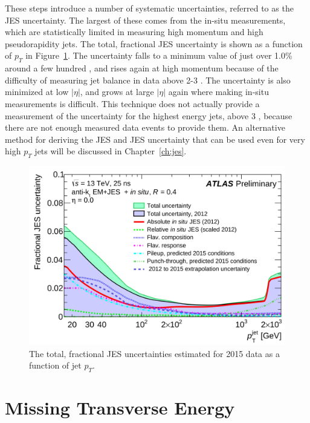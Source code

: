 These steps introduce a number of systematic uncertainties, referred to as the \ac{JES} uncertainty.
The largest of these comes from the in-situ measurements, which are statistically limited in measuring high momentum and high pseudorapidity jets.
The total, fractional \ac{JES} uncertainty is shown as a function of $p_T$ in Figure~\ref{fig:reco_jesunc}.
The uncertainty falls to a minimum value of just over 1.0\% around a few hundred \GeV, and rises again at high momentum because of the difficulty of measuring jet balance in data above 2-3 \TeV.
The uncertainty is also minimized at low $|\eta|$, and grows at large $|\eta|$ again where making in-situ measurements is difficult.
This technique does not actually provide a measurement of the uncertainty for the highest energy jets, above 3 \TeV, because there are not enough measured data events to provide them.
An alternative method for deriving the \ac{JES} and \ac{JES} uncertainty that can be used even for very high $p_T$ jets will be discussed in Chapter~\ref{ch:jes}.

\begin{figure}
\includegraphics[width=\fullfig]{figures/reco_jes_pt.png}
\caption{The total, fractional \ac{JES} uncertainties estimated for 2015 data as a function of jet $p_T$.}
\label{fig:reco_jesunc}
\end{figure}


\section{Missing Transverse Energy}
\label{sec:missing_energy}

